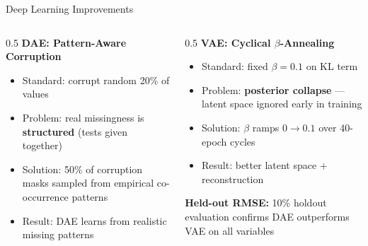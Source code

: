 \documentclass[aspectratio=169, 11pt]{beamer}
\begin{document}
\begin{frame}{Deep Learning Improvements}
  \begin{columns}[T]
    \begin{column}{0.5\textwidth}
      \textbf{DAE: Pattern-Aware Corruption}
      \begin{itemize}
        \item Standard: corrupt random 20\% of values
        \item Problem: real missingness is \textbf{structured} (tests given together)
        \item Solution: 50\% of corruption masks sampled from empirical co-occurrence patterns
        \item Result: DAE learns from realistic missing patterns
      \end{itemize}
    \end{column}
    \begin{column}{0.5\textwidth}
      \textbf{VAE: Cyclical $\beta$-Annealing}
      \begin{itemize}
        \item Standard: fixed $\beta = 0.1$ on KL term
        \item Problem: \textbf{posterior collapse} --- latent space ignored early in training
        \item Solution: $\beta$ ramps $0 \to 0.1$ over 40-epoch cycles
        \item Result: better latent space + reconstruction
      \end{itemize}

      \vspace{0.5em}
      \textbf{Held-out RMSE:} 10\% holdout evaluation confirms DAE outperforms VAE on all variables
    \end{column}
  \end{columns}
\end{frame}
\end{document}
